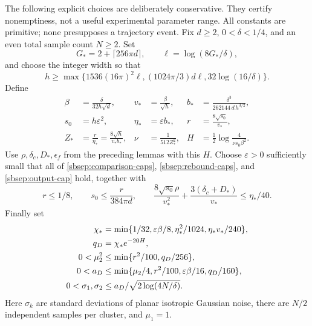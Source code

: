\documentclass[11pt]{article}
\theoremstyle{remark}
\begin{document}
The following explicit choices are deliberately conservative. They certify
nonemptiness, not a useful experimental parameter range. All constants
are primitive; none presupposes a trajectory event.
Fix $d\ge2$, $0<\delta<1/4$, and an even total sample count $N\ge2$.
Set
\[
 G_*=2+\lceil256\pi d\rceil,\qquad \ell=\log(8G_*/\delta),
\]
and choose the integer width so that
\begin{equation}\label{sbsep:width}
 h\ge\max\{1536(16\pi)^2\ell,
           (1024\pi/3)d\ell,32\log(16/\delta)\}.
\end{equation}
Define
\begin{align*}
 \beta&=\frac{\delta}{32h\sqrt d},&
 v_*&=\frac\beta{\sqrt h},&
 b_*&=\frac{\delta^3}{262144\,d\,h^{3/2}},\\
 s_0&=h\varepsilon^2,& \eta_*&=\varepsilon b_*,&
 r&=\frac{8\sqrt{s_0}}{v_*},\\
 Z_*&=\frac r{\eta_*}=\frac{8\sqrt h}{v_*b_*},&
 \nu&=\frac1{512Z_*^2},&
 H&=\frac12\log\frac4{\nu s_0\beta^2}.
\end{align*}
Use $\rho,\delta_c,D_*,\epsilon_f$ from the preceding lemmas with
this $H$. Choose $\varepsilon>0$ sufficiently small that all of
\eqref{sbsep:comparison-caps}, \eqref{sbsep:rebound-caps}, and
\eqref{sbsep:output-cap} hold, together with
\begin{equation}\label{sbsep:remaining-caps}
 r\le1/8,\qquad s_0\le\frac r{384\pi d},\qquad
 \frac{8\sqrt{s_0}\rho}{v_*^2}
       +\frac{3(\delta_c+D_*)}{v_*}\le\eta_*/40.
\end{equation}
Finally set
\begin{align}
 \chi_*&=\min\{1/32,\varepsilon\beta/8,
                   \eta_*^2/1024,\eta_*v_*/240\},\notag\\
 q_D&=\chi_*e^{-20H},\label{sbsep:data-caps}\\
 0<\mu_2^2&\le\min\{r^2/100,q_D/256\},\notag\\
 0<a_D&\le\min\{\mu_2/4,r^2/100,
                           \varepsilon\beta/16,q_D/160\},\notag\\
 0<\sigma_1,\sigma_2&\le
                   a_D/\sqrt{2\log(4N/\delta)}.\notag
\end{align}
Here $\sigma_k$ are standard deviations of planar isotropic Gaussian
noise, there are $N/2$ independent samples per cluster, and $\mu_1=1$.
\end{document}
